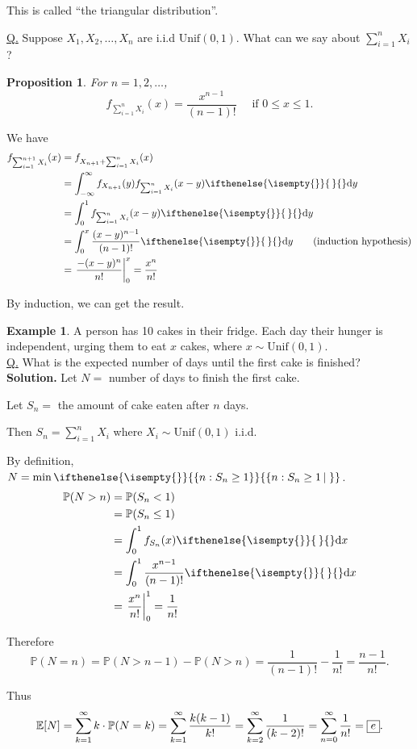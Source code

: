 \documentclass[a4paper,11pt]{amsbook}
\makeatletter
\renewenvironment{proof}[1][\proofname]{\par
    \pushQED{\qed}%
    \normalfont \topsep6\p@\@plus6\p@\relax
    \trivlist
    \itemindent\z@ %
    \item[\hskip\labelsep
          \scshape
      #1\@addpunct{.}]\ignorespaces
}{%
    \popQED\endtrivlist\@endpefalse
}
\newtheorem{proposition}{\hspace{-2em} \color{darkblue} Proposition}[chapter]
\theoremstyle{definition}
\newtheorem{example}{\hspace{-2em} \color{darkblue} Example}[chapter]
\theoremstyle{remark}
\newcommand{\E}{\mathbb{E}}
\renewcommand{\P}{\mathbb{P}}
\newcommand\0{\varnothing}
\newcommand\dx[1][]{\ifthenelse{\isempty{#1}}{\,}{}\mathrm{d}x}
\newcommand\dy[1][]{\ifthenelse{\isempty{#1}}{\,}{}\mathrm{d}y}
\newcommand\Unif{\text{Unif}}
\newcommand\set[2][]
{
    \ifthenelse{\isempty{#1}}
    {
        \left\{#2\right\}
    }
    {
        \left\{#2\left|\,#1\right.\right\}
    }
}
\makeatother
\begin{document}
    This is called ``the triangular distribution''.

    \noindent \underline{Q.} Suppose $X_1,X_2,\ldots,X_n$ are i.i.d $\Unif(0,1)$. What can we say about $\sum_{i=1}^nX_i$?
    \begin{proposition}
        For $n=1,2,\ldots$, $$f_{\sum_{i=1}^nX_i}(x)=\frac{x^{n-1}}{(n-1)!}\quad \text{ if }0\leq x\leq1.$$
    \end{proposition}
    \begin{proof}
        We have \begin{align*}
            f_{\sum_{i=1}^{n+1}X_i}(x)&=f_{X_{n+1}+\sum_{i=1}^nX_i}(x) \\
            &=\int_{-\infty}^\infty f_{X_{n+1}}(y)f_{\sum_{i=1}^nX_i}(x-y)\dy \\
            &=\int_0^1f_{\sum_{i=1}^nX_i}(x-y)\dy \\
            &=\int_0^x\frac{(x-y)^{n-1}}{(n-1)!}\dy \tag{induction hypothesis} \\
            &=\left.\frac{-(x-y)^n}{n!}\right|_0^x=\frac{x^n}{n!}
        \end{align*}

        By induction, we can get the result.
    \end{proof}

    \begin{example}
        A person has 10 cakes in their fridge.
        Each day their hunger is independent,  urging them to eat $x$ cakes, where $x\sim\Unif(0,1)$.\\
        \underline{Q.} What is the expected number of days until the first cake is finished?\\
        \textbf{Solution.} Let $N=$ number of days to finish the first cake.

        Let $S_n=$ the amount of cake eaten after $n$ days.

        Then $S_n=\sum_{i=1}^nX_i$ where $X_i\sim\Unif(0,1)$ i.i.d.

        By definition, $N=\min\set{n:S_n\geq1}$.
        \begin{align*}
            \P(N>n)&=\P(S_n<1) \\
            &=\P(S_n\leq1) \\
            &=\int_0^1f_{S_n}(x)\dx \\
            &=\int_0^1\frac{x^{n-1}}{(n-1)!}\dx \\
            &=\left.\frac{x^n}{n!}\right|_0^1=\frac{1}{n!}
        \end{align*}

        Therefore $$\P(N=n)=\P(N>n-1)-\P(N>n)=\frac{1}{(n-1)!}-\frac{1}{n!}=\frac{n-1}{n!}.$$

        Thus $$\E[N]=\sum_{k=1}^\infty k\cdot\P(N=k)=\sum_{k=1}^\infty\frac{k(k-1)}{k!}=\sum_{k=2}^\infty\frac{1}{(k-2)!}=\sum_{n=0}^\infty\frac{1}{n!}=\fbox{$e$}.$$
    \end{example}
\end{document}
